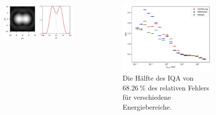\documentclass[aspectratio=1610, professionalfonts, 9pt]{beamer}
\begin{document}
  \begin{frame}
    \begin{columns}
      \begin{figure}
        \includegraphics[width=\textwidth]{pictures/resolution.jpg}
        \caption{}
        \label{}
      \end{figure}
      \begin{figure}
        \includegraphics[width=\textwidth]{pictures/RF_mean_resolution.pdf}
        \caption{Die Hälfte des IQA von $\SI{68,26}{\percent}$ des relativen Fehlers für verschiedene Energiebereiche.}
        \label{}
      \end{figure}
    \end{columns}
  \end{frame}
\end{document}
